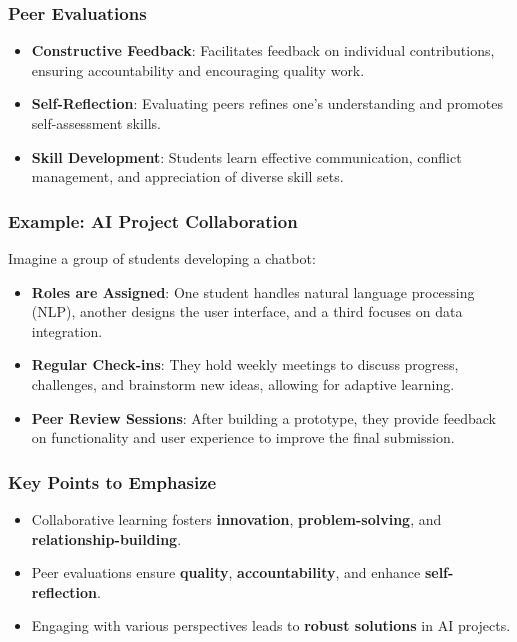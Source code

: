 \documentclass[aspectratio=169]{beamer}
\begin{document}
\begin{frame}[fragile]
    \frametitle{Peer Evaluations}
    \begin{itemize}
        \item \textbf{Constructive Feedback}: Facilitates feedback on individual contributions, ensuring accountability and encouraging quality work.
        \item \textbf{Self-Reflection}: Evaluating peers refines one’s understanding and promotes self-assessment skills.
        \item \textbf{Skill Development}: Students learn effective communication, conflict management, and appreciation of diverse skill sets.
    \end{itemize}
\end{frame}

\begin{frame}[fragile]
    \frametitle{Example: AI Project Collaboration}
    Imagine a group of students developing a chatbot:
    \begin{itemize}
        \item \textbf{Roles are Assigned}: One student handles natural language processing (NLP), another designs the user interface, and a third focuses on data integration. 
        \item \textbf{Regular Check-ins}: They hold weekly meetings to discuss progress, challenges, and brainstorm new ideas, allowing for adaptive learning.
        \item \textbf{Peer Review Sessions}: After building a prototype, they provide feedback on functionality and user experience to improve the final submission.
    \end{itemize}
\end{frame}

\begin{frame}[fragile]
    \frametitle{Key Points to Emphasize}
    \begin{itemize}
        \item Collaborative learning fosters \textbf{innovation}, \textbf{problem-solving}, and \textbf{relationship-building}.
        \item Peer evaluations ensure \textbf{quality}, \textbf{accountability}, and enhance \textbf{self-reflection}.
        \item Engaging with various perspectives leads to \textbf{robust solutions} in AI projects.
    \end{itemize}
\end{frame}
\end{document}
